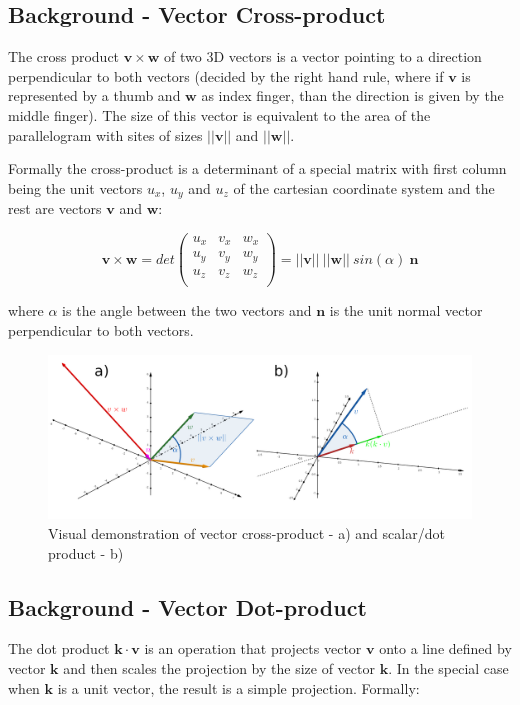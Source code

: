\subsection{Background - Vector Cross-product}

The cross product $\bm{v} \times \bm{w}$ of two 3D vectors is a vector pointing to a direction perpendicular to both vectors (decided by the right hand rule, where if $\bm{v}$  is represented by a thumb and $\bm{w}$ as index finger, than the direction is given by the middle finger). The size of this vector is equivalent to the area of the parallelogram with sites of sizes $||\bm{v}||$ and $||\bm{w}||$.

Formally the cross-product is a determinant of a special matrix with first column being the unit vectors $u_x$, $u_y$ and $u_z$ of the cartesian coordinate system and the rest are vectors $\bm{v}$ and $\bm{w}$:

$$\bm{v} \times \bm{w} = det
\left(
\begin{array}{ccc}
    u_x & v_{x} & w_{x}\\
    u_y & v_{y} & w_{y}\\
    u_z & v_{z} & w_{z}\\
\end{array}
\right) = ||\bm{v}||~||\bm{w}||~sin(\alpha)~\bm{n}
$$

where $\alpha$ is the angle between the two vectors and $\bm{n}$ is the unit normal vector perpendicular to both vectors.

\begin{figure}
    \centering
    \includegraphics[scale=0.23]{imgs_tomas/vector_ops.png}
    \caption{Visual demonstration of vector cross-product - a) and scalar/dot product - b)}
    \label{fig:vector ops}
\end{figure}

\subsection{Background - Vector Dot-product}
The dot product $\bm{k} \cdot \bm{v}$ is an operation that projects vector $\bm{v}$ onto a line defined by vector $\bm{k}$ and then scales the projection by the size of vector $\bm{k}$. In the special case when $\bm{k}$ is a unit vector, the result is a simple projection. Formally:

